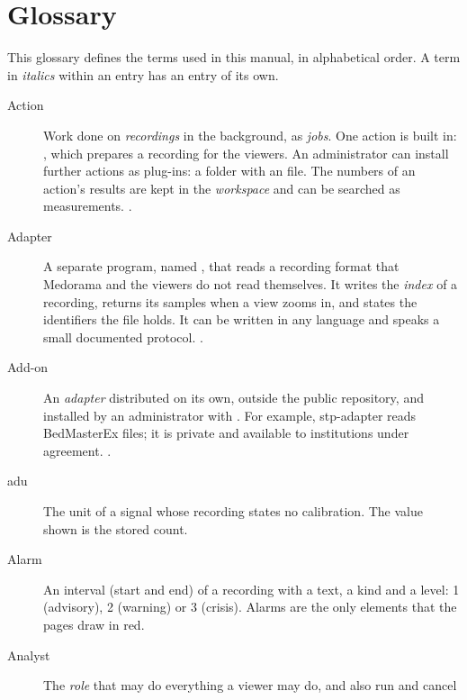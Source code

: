 \chapter{Glossary}
\label{chap:glossary}

This glossary defines the terms used in this manual, in alphabetical order. A term in
\textit{italics} within an entry has an entry of its own.

\begin{description}
\item[Action] Work done on \textit{recordings} in the background, as \textit{jobs}. One action
  is built in: , which prepares a recording for the viewers. An administrator can
  install further actions as plug-ins: a folder with an  file. The numbers of
  an action's results are kept in the \textit{workspace} and can be searched as measurements.
  .
\item[Adapter] A separate program, named , that reads a recording format
  that Medorama and the viewers do not read themselves. It writes the \textit{index} of a
  recording, returns its samples when a view zooms in, and states the identifiers the file
  holds. It can be written in any language and speaks a small documented protocol.
  .
\item[Add-on] An \textit{adapter} distributed on its own, outside the public repository, and
  installed by an administrator with . For example, stp-adapter
  reads BedMasterEx  files; it is private and available to institutions under
  agreement. .
\item[adu] The unit of a signal whose recording states no calibration. The value shown is the
  stored count.
\item[Alarm] An interval (start and end) of a recording with a text, a kind and a level: 1
  (advisory), 2 (warning) or 3 (crisis). Alarms are the only elements that the pages draw in red.
\item[Analyst] The \textit{role} that may do everything a viewer may do, and also run and cancel

\end{description}

